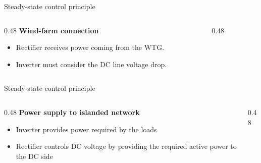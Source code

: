 \begin{frame}{Steady-state control principle}
  \begin{columns}[T,onlytextwidth]
    \begin{column}{0.48\textwidth}
      \textbf{Wind-farm connection}
      \begin{itemize}
        \setlength{\itemsep}{0.25em}
        \item Rectifier receives power coming from the WTG.
        \item Inverter must consider the DC line voltage drop.
      \end{itemize}
    \end{column}
    \begin{column}{0.48\textwidth}
    \end{column}
  \end{columns}
\end{frame}


\begin{frame}{Steady-state control principle}
  \begin{columns}[T,onlytextwidth]
    \begin{column}{0.48\textwidth}
      \textbf{Power supply to islanded network}
      \begin{itemize}
        \setlength{\itemsep}{0.25em}
        \item Inverter provides power required by the loads
        \item Rectifier controls DC voltage by providing the required active power to the DC side
      \end{itemize}
    \end{column}
    \begin{column}{0.48\textwidth}
    \end{column}
  \end{columns}
\end{frame}


